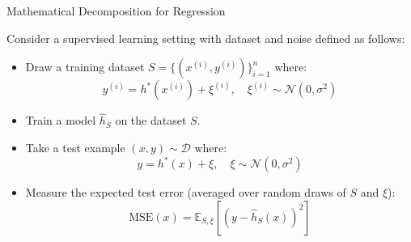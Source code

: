 \documentclass{beamer}
\begin{document}
\begin{frame}{Mathematical Decomposition for Regression}

    Consider a supervised learning setting with dataset and noise defined as follows:
    \vspace{0.3cm}
    \begin{itemize}
        \item Draw a training dataset $S = \{(x^{(i)}, y^{(i)})\}_{i=1}^n$ where:
        \[
        y^{(i)} = h^*(x^{(i)}) + \xi^{(i)}, \quad \xi^{(i)} \sim \mathcal{N}(0, \sigma^2)
        \]
        
        \item Train a model $\hat{h}_S$ on the dataset $S$.

        \item Take a test example $(x, y)\sim\mathcal{D}$ where:
        \[
        y = h^*(x) + \xi, \quad \xi \sim \mathcal{N}(0, \sigma^2)
        \]

        \item Measure the expected test error (averaged over random draws of $S$ and $\xi$):
        \[
        \text{MSE}(x) = \mathbb{E}_{S, \xi} \left[ (y - \hat{h}_S(x))^2 \right]
        \]
    \end{itemize}
\end{frame}
\end{document}
